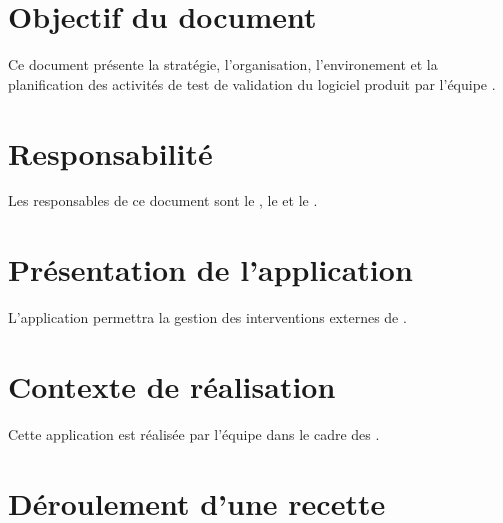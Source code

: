 \section{Objectif du document}
	Ce document présente la stratégie, l'organisation, l'environement et la planification des activités de test de validation du logiciel produit par l'équipe \nomEquipe{}.
	
\section{Responsabilité}
	Les responsables de ce document sont le \CP, le \RQ{} et le \RD.
	
\section{Présentation de l'application}
	L'application permettra la gestion des interventions externes de \nomClient.
	
\section{Contexte de réalisation}
	Cette application est réalisée par l'équipe \nomEquipe{} dans le cadre des \PIC.

\section{Déroulement d'une recette}


